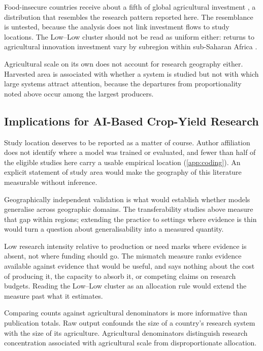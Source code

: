 \documentclass[ASNA,twocolumn]{USG}
\begin{document}
Food-insecure countries receive about a fifth of global agricultural investment
\cite{Zhao2023}, a distribution that resembles the research pattern reported here. The
resemblance is untested, because the analysis does not link investment flows to study locations. The Low--Low cluster should not be read as uniform
either: returns to agricultural innovation investment vary by subregion within sub-Saharan
Africa \cite{Malec2024}.

Agricultural scale on its own does not account for research geography either. Harvested
area is associated with whether a system is studied but not with which large systems attract
attention, because the departures from proportionality noted above occur among the largest
producers.

\subsection{Implications for AI-Based Crop-Yield Research}

Study location deserves to be reported as a matter of course. Author affiliation does not
identify where a model was trained or evaluated, and fewer than half of the eligible studies
here carry a usable empirical location (\ref{app:coding}). An explicit statement of study
area would make the geography of this literature measurable without inference.

Geographically independent validation is what would establish whether models generalise across
geographic domains. The
transferability studies above measure that gap within regions; extending the practice to
settings where evidence is thin would turn a question about generalisability into a measured
quantity.

Low research intensity relative to production or need marks where evidence is absent, not
where funding should go. The mismatch measure ranks evidence available against evidence that
would be useful, and says nothing about the cost of producing it, the capacity to absorb it,
or competing claims on research budgets. Reading the Low--Low cluster as an allocation rule
would extend the measure past what it estimates.

Comparing counts against agricultural denominators is more informative than publication
totals. Raw output confounds the size of a country's research system with the size of its
agriculture. Agricultural denominators distinguish research concentration associated with
agricultural scale from disproportionate allocation.
\end{document}
